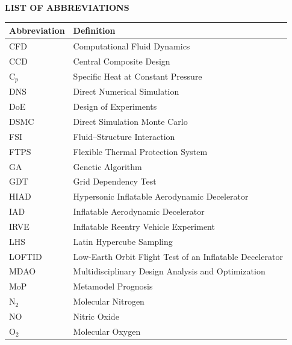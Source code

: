 \clearpage
{}
{}
\begin{center}
{\bfseries \Large LIST OF ABBREVIATIONS}
\end{center}
\vspace{3em}


\begin{center}
\begin{tabularx}{0.8\textwidth} { 
   >{\raggedright\arraybackslash}X 
   >{\raggedright\arraybackslash}X}
    \hline
    \textbf{Abbreviation} & \textbf{Definition}            \\
    \hline
    CFD         & Computational Fluid Dynamics          \\
    CCD         & Central Composite Design              \\
    C$_p$       & Specific Heat at Constant Pressure     \\
    DNS         & Direct Numerical Simulation            \\
    DoE         & Design of Experiments                  \\
    DSMC        & Direct Simulation Monte Carlo          \\
    FSI         & Fluid--Structure Interaction            \\
    FTPS        & Flexible Thermal Protection System     \\
    GA          & Genetic Algorithm                      \\
    GDT         & Grid Dependency Test                   \\
    HIAD        & Hypersonic Inflatable Aerodynamic Decelerator \\
    IAD         & Inflatable Aerodynamic Decelerator     \\
    IRVE        & Inflatable Reentry Vehicle Experiment  \\
    LHS         & Latin Hypercube Sampling               \\
    LOFTID      & Low-Earth Orbit Flight Test of an Inflatable Decelerator \\
    MDAO        & Multidisciplinary Design Analysis and Optimization \\
    MoP         & Metamodel Prognosis                    \\
    N$_2$       & Molecular Nitrogen                     \\
    NO          & Nitric Oxide                           \\
    O$_2$       & Molecular Oxygen                       \\

\end{tabularx}
\end{center}
